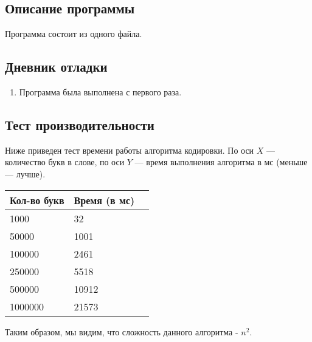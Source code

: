 \documentclass[12pt]{article}
\begin{document}
    \subsection*{Описание программы}

    Программа состоит из одного файла.

    \subsection*{Дневник отладки}

    \begin{enumerate}
    \item Программа была выполнена с первого раза.
    \end{enumerate}

    \subsection*{Тест производительности}

    Ниже приведен тест времени работы алгоритма кодировки. По оси $X$ — количество 
    букв в слове, по оси $Y$ — время выполнения алгоритма в мс (меньше 
    — лучше).
    

    \begin{tabular}{ | l | l | l | }
        \hline
            Кол-во букв    & Время (в мс) \\ \hline
            1000             & 32           \\
            50000            & 1001          \\
            100000           & 2461         \\
            250000           & 5518         \\
            500000           & 10912         \\
            1000000           & 21573         \\
        \hline
    \end{tabular}

    Таким образом, мы видим, что сложность данного алгоритма - $n^2$.
\end{document}
